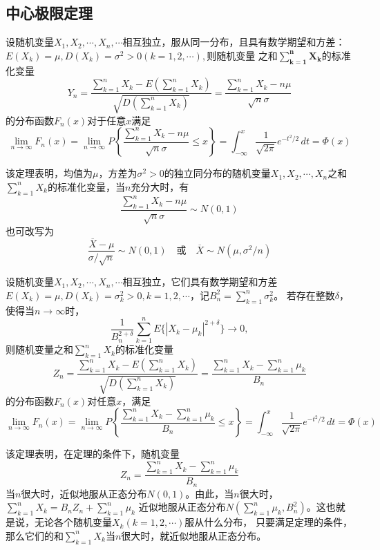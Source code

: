 \subsection{中心极限定理}
\begin{theorem}[独立同分布的中心极限定理]
    设随机变量$X_1,X_2,\cdots,X_n,\cdots$相互独立，服从同一分布，且具有数学期望和方差：$E(X_k)=\mu,D(X_k)=\sigma^2>0(k=1,2,\cdots),$则随机变量
    之和$\boldsymbol{\sum _{k=1}^n X_k}$的标准化变量
    $$Y_n=\frac{\sum\limits _{k=1}^n X_k-E(\sum\limits _{k=1} ^n X_k)}{\sqrt{D(\sum\limits_{k=1}^n X_k)}}=\frac{\sum\limits_{k=1}^n X_k-n\mu}{\sqrt{n}\sigma}$$
    的分布函数$F_n(x)$对于任意$x$满足
    $$\lim _{n\to\infty} F_n(x)=\lim _{n\to \infty}P\left\{ \frac{\sum\limits_{k=1}^n X_k-n\mu}{\sqrt{n}\sigma}\leq x\right\}=\int_{-\infty}^{x} \frac{1}{\sqrt{2\pi}} e^{-t^2/2}\,dt=\varPhi (x)  $$
\end{theorem}
\begin{remark}
    该定理表明，均值为$\mu$，方差为$\sigma^2>0$的独立同分布的随机变量$X_1,X_2,\cdots,X_n$之和$\displaystyle{\sum _{k=1}^n X_k}$的标准化变量，当$n$充分大时，有
    $$\frac{\sum\limits_{k=1}^n X_k -n\mu}{\sqrt{n}\sigma}\sim N(0,1) $$
    也可改写为$$\frac{\overline{X}-\mu}{\sigma/\sqrt{n}} \sim N(0,1) \quad \mbox{或} \quad \overline{X}\sim N(\mu,\sigma^2/n)$$
\end{remark}

\begin{theorem}
    设随机变量$X_1,X_2,\cdots,X_n,\cdots$相互独立，它们具有数学期望和方差$E(X_k)=\mu, D(X_k)=\sigma_k^2>0,k=1,2,\cdots$，记$\displaystyle{B_n^2=\sum_{k=1}^n\sigma_k^2}$。
    若存在整数$\delta$，使得当$n\to \infty$时，
    $$\frac{1}{B_n^{2+\delta}}\sum_{k=1}^n E\{{|X_k-\mu_k|}^{2+\delta}\} \to 0,$$
    则随机变量之和$\displaystyle{\sum _{k=1}^n X_k}$的标准化变量
    $$Z_n=\frac{\sum\limits _{k=1}^n X_k-E(\sum\limits _{k=1} ^n X_k)}{\sqrt{D(\sum\limits_{k=1}^n X_k)}}=\frac{\sum\limits_{k=1}^n X_k-\sum\limits_{k=1}^n \mu_k}{B_n}$$
    的分布函数$F_n(x)$对任意$x$，满足
    $$\lim_{n\to\infty} F_n(x)=\lim_{n\to\infty} P\left\{  \frac{\sum\limits_{k=1}^n X_k-\sum\limits_{k=1}^n \mu_k}{B_n}\leq x  \right\} =\int_{-\infty}^{x} \frac{1}{\sqrt{2\pi}} e^{-t^2/2}\,dt=\varPhi (x) $$
\end{theorem}

\begin{remark}
    该定理表明，在定理的条件下，随机变量 $$Z_n=\frac{\sum\limits_{k=1}^n X_k-\sum\limits_{k=1}^n \mu_k}{B_n}$$
    当$n$很大时，近似地服从正态分布$N(0,1)$。由此，当$n$很大时，$\displaystyle{\sum_{k=1}^n X_k=B_nZ_n+\sum_{k=1}^n \mu_k}$
    近似地服从正态分布$\displaystyle{N(\sum_{k=1}^n\mu_k,B_n^2)}$。这也就是说，无论各个随机变量$X_k(k=1,2,\cdots)$服从什么分布，
    只要满足定理的条件，那么它们的和$\displaystyle{\sum_{k=1}^nX_k}$当$n$很大时，就近似地服从正态分布。
\end{remark}

